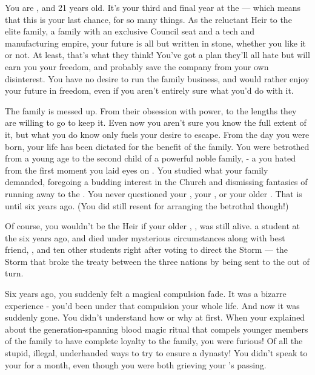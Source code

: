 \documentclass[char]{GL2020}
\begin{document}
\name{\cHeir{}}

You are \cHeir{\intro}, and 21 years old. It's your third and final year at the \pSchool{} — which means that this is your last chance, for so many things. As the reluctant Heir to the elite \cHeir{\formal} family, a family with an exclusive Council seat and a tech and manufacturing empire, your future is all but written in stone, whether you like it or not. At least, that's what they think! You've got a plan they'll all hate but will earn you your freedom, and probably save the company from your own disinterest. You have no desire to run the family business, and would rather enjoy your future in freedom, even if you aren't entirely sure what you'd do with it.

The \cHeir{\formal} family is messed up. From their obsession with power, to the lengths they are willing to go to keep it. Even now you aren’t sure you know the full extent of it, but what you do know only fuels your desire to escape. From the day you were born, your life has been dictated for the benefit of the family. You were betrothed from a young age to the second child of a powerful \pFarm{} noble family, \cChupStudent{\full} - a \cChupStudent{\kid} you hated from the first moment you laid eyes on \cChupStudent{\them}. You studied what your family demanded, foregoing a budding interest in the Church and dismissing fantasies of running away to the \pShip{}. You never questioned your \cFaledonParent{\parent} \cFaledonParent{}, your \cDiplomat{\auncle} \cDiplomat{\auncle}, or your older \cHeirSibling{\sibling} \cHeirSibling{}. That is until six years ago. (You did still resent \cDiplomat{} for arranging the betrothal though!)

Of course, you wouldn't be the \cHeir{\formal} Heir if your older \cHeirSibling{\sibling}, \cHeirSibling{\full}, was still alive. \cHeirSibling{\Theywere} a student at the \pSchool{} six years ago, and died under mysterious circumstances along with \cHeirSibling{\their} best friend, \cKidScientist{\full}, and ten other students right after voting to direct the Storm — the Storm that broke the treaty between the three nations by being sent to the \pShip{} out of turn. 

Six years ago, you suddenly felt a magical compulsion fade. It was a bizarre experience - you’d been under that compulsion your whole life. And now it was suddenly gone. You didn’t understand how or why at first. When your \cFaledonParent{\parent} explained about the generation-spanning blood magic ritual that compels younger members of the \cHeir{\formal} family to have complete loyalty to the family, you were furious! Of all the stupid, illegal, underhanded ways to try to ensure a dynasty! You didn’t speak to your \cFaledonParent{\parent} for a month, even though you were both grieving your \cHeirSibling{\sibling}’s passing.
\end{document}
